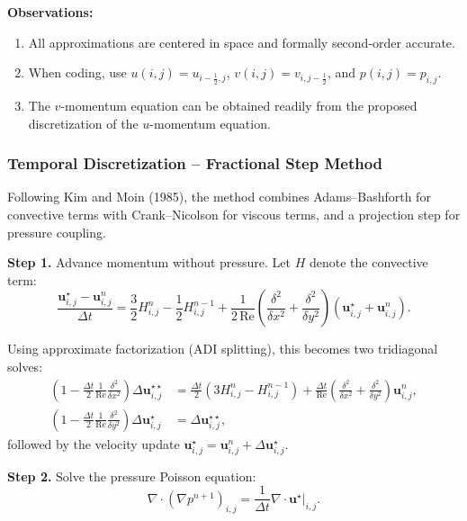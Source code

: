 \textbf{Observations:}
\begin{enumerate}
  \item All approximations are centered in space and formally second-order accurate.
  \item When coding, use $u(i,j) = u_{i-\frac{1}{2},j}$, $v(i,j) = v_{i,j-\frac{1}{2}}$, and $p(i,j) = p_{i,j}$.
  \item The $v$-momentum equation can be obtained readily from the proposed discretization of the $u$-momentum equation.
\end{enumerate}

\subsubsection*{Temporal Discretization -- Fractional Step Method}

Following Kim and Moin (1985), the method combines Adams--Bashforth for convective terms with Crank--Nicolson for viscous terms, and a projection step for pressure coupling.

\textbf{Step 1.} Advance momentum without pressure. Let $H$ denote the convective term:
\begin{equation}
  \frac{\mathbf{u}^\star_{i,j} - \mathbf{u}^n_{i,j}}{\Delta t} = \frac{3}{2}H^n_{i,j} - \frac{1}{2}H^{n-1}_{i,j} + \frac{1}{2\,\mathrm{Re}}\left(\frac{\delta^2}{\delta x^2} + \frac{\delta^2}{\delta y^2}\right)\left(\mathbf{u}^\star_{i,j} + \mathbf{u}^n_{i,j}\right). \label{eq:step1}
\end{equation}

Using approximate factorization (ADI splitting), this becomes two tridiagonal solves:
\begin{align}
  \left(1 - \frac{\Delta t}{2}\frac{1}{\mathrm{Re}}\frac{\delta^2}{\delta x^2}\right)\Delta \mathbf{u}^{\star\star}_{i,j} &= \frac{\Delta t}{2}\left(3H^n_{i,j} - H^{n-1}_{i,j}\right) + \frac{\Delta t}{\mathrm{Re}}\left(\frac{\delta^2}{\delta x^2} + \frac{\delta^2}{\delta y^2}\right)\mathbf{u}^n_{i,j}, \label{eq:adi_x} \\
  \left(1 - \frac{\Delta t}{2}\frac{1}{\mathrm{Re}}\frac{\delta^2}{\delta y^2}\right)\Delta \mathbf{u}^\star_{i,j} &= \Delta \mathbf{u}^{\star\star}_{i,j}, \label{eq:adi_y}
\end{align}
followed by the velocity update $\mathbf{u}^\star_{i,j} = \mathbf{u}^n_{i,j} + \Delta \mathbf{u}^\star_{i,j}$.

\textbf{Step 2.} Solve the pressure Poisson equation:
\begin{equation}
  \nabla \cdot \left(\nabla p^{n+1}\right)_{i,j} = \frac{1}{\Delta t}\nabla \cdot \mathbf{u}^\star\big|_{i,j}. \label{eq:ppe}
\end{equation}

